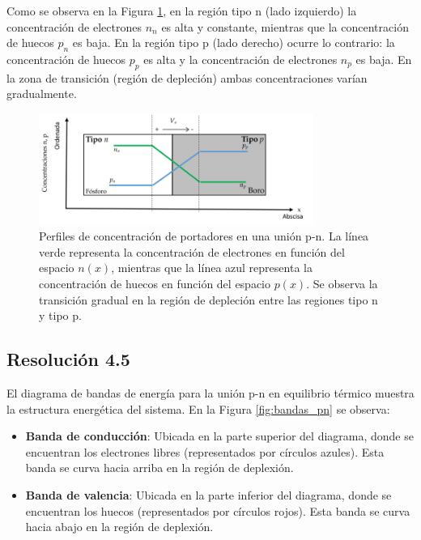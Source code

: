 \documentclass[
  11pt,
  letterpaper,
   addpoints,
  ]{exam}
\begin{document}
\begin{questions}
\begin{solution}
    Como se observa en la Figura \ref{fig:concentraciones_pn}, en la región tipo n (lado izquierdo) la concentración de electrones $n_n$ es alta y constante, mientras que la concentración de huecos $p_n$ es baja. En la región tipo p (lado derecho) ocurre lo contrario: la concentración de huecos $p_p$ es alta y la concentración de electrones $n_p$ es baja. En la zona de transición (región de depleción) ambas concentraciones varían gradualmente.

    \begin{figure}[H]
        \centering
        \includegraphics[width=0.8\textwidth]{../figures/Auxiliar_2_9}
        \caption{Perfiles de concentración de portadores en una unión p-n. La línea verde representa la concentración de electrones en función del espacio $n(x)$, mientras que la línea azul representa la concentración de huecos en función del espacio $p(x)$. Se observa la transición gradual en la región de depleción entre las regiones tipo n y tipo p.}
        \label{fig:concentraciones_pn}
    \end{figure}

    \subsection*{Resolución 4.5}
    
    El diagrama de bandas de energía para la unión p-n en equilibrio térmico muestra la estructura energética del sistema. En la Figura \ref{fig:bandas_pn} se observa:

    \begin{itemize}
        \item \textbf{Banda de conducción}: Ubicada en la parte superior del diagrama, donde se encuentran los electrones libres (representados por círculos azules). Esta banda se curva hacia arriba en la región de deplexión.
        
        \item \textbf{Banda de valencia}: Ubicada en la parte inferior del diagrama, donde se encuentran los huecos (representados por círculos rojos). Esta banda se curva hacia abajo en la región de deplexión.
        

\end{itemize}
\end{solution}
\end{questions}
\end{document}
